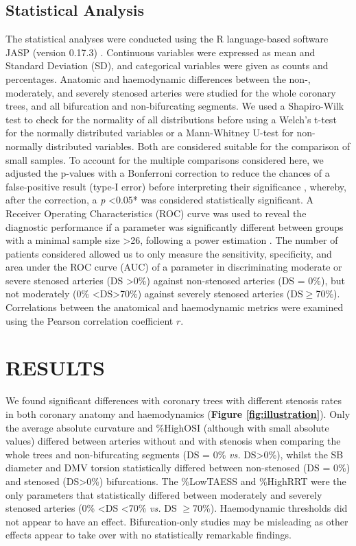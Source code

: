\documentclass[preprint,11pt,review]{elsarticle}
\begin{document}
\subsection{Statistical Analysis}
The statistical analyses were conducted using the R language-based software JASP (version 0.17.3) \cite{JASPTeam2023JASP}. Continuous variables were expressed as mean and Standard Deviation (SD), and categorical variables were given as counts and percentages. Anatomic and haemodynamic differences between the non-, moderately, and severely stenosed arteries were studied for the whole coronary trees, and all bifurcation and non-bifurcating segments. We used a Shapiro-Wilk test to check for the normality of all distributions before using a Welch’s t-test for the normally distributed variables or a Mann-Whitney U-test for non-normally distributed variables. Both are considered suitable for the comparison of small samples. To account for the multiple comparisons considered here, we adjusted the p-values with a Bonferroni correction to reduce the chances of a false-positive result (type-I error) before interpreting their significance \cite{Dunn1961Multiple}, whereby, after the correction, a \textit{p} \textless 0.05* was considered statistically significant. A Receiver Operating Characteristics (ROC) curve was used to reveal the diagnostic performance if a parameter was significantly different between groups with a minimal sample size \textgreater 26, following a power estimation \cite{hanley_meaning_1982} . The number of patients considered allowed us to only measure the sensitivity, specificity, and area under the ROC curve (AUC) of a parameter in discriminating moderate or severe stenosed arteries (DS \textgreater 0\%) against non-stenosed arteries (DS = 0\%), but not moderately (0\% \textless DS>70\%) against severely stenosed arteries (DS$\geq$70\%). Correlations between the anatomical and haemodynamic metrics were examined using the Pearson correlation coefficient $r$.


\section{RESULTS}

We found significant differences with coronary trees with different stenosis rates in both coronary anatomy and haemodynamics (\textbf{Figure \ref{fig:illustration}}). Only the average absolute curvature and \%HighOSI (although with small absolute values) differed between arteries without and with stenosis when comparing the whole trees and non-bifurcating segments (DS = 0\% \textit{vs.} DS\textgreater 0\%), whilst the SB diameter and DMV torsion statistically differed between non-stenosed (DS = 0\%) and stenosed (DS\textgreater 0\%) bifurcations. The \%LowTAESS and \%HighRRT were the only parameters that statistically differed between moderately and severely stenosed arteries (0\% \textless DS \textless70\% \textit{vs.} DS $\geq$70\%). Haemodynamic thresholds did not appear to have an effect. Bifurcation-only studies may be misleading as other effects appear to take over with no statistically remarkable findings. 
\end{document}
